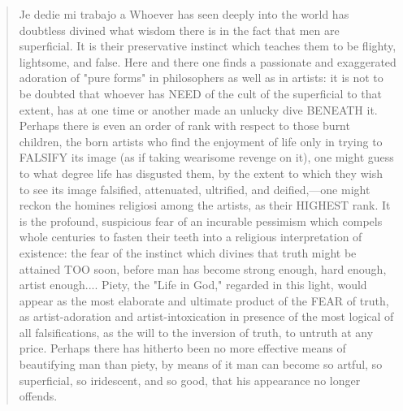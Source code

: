 \newenvironment{dedication}
     {\vspace{6ex}\begin{quotation}\begin{center}\begin{em}}
     {\par\end{em}\end{center}\end{quotation}}

     \begin{dedication}
Je dedie mi trabajo a 
Whoever has seen deeply into the world has doubtless divined what wisdom there is in the fact that men are superficial. It is their preservative instinct which teaches them to be flighty, lightsome, and false. Here and there one finds a passionate and exaggerated adoration of "pure forms" in philosophers as well as in artists: it is not to be doubted that whoever has NEED of the cult of the superficial to that extent, has at one time or another made an unlucky dive BENEATH it. Perhaps there is even an order of rank with respect to those burnt children, the born artists who find the enjoyment of life only in trying to FALSIFY its image (as if taking wearisome revenge on it), one might guess to what degree life has disgusted them, by the extent to which they wish to see its image falsified, attenuated, ultrified, and deified,—one might reckon the homines religiosi among the artists, as their HIGHEST rank. It is the profound, suspicious fear of an incurable pessimism which compels whole centuries to fasten their teeth into a religious interpretation of existence: the fear of the instinct which divines that truth might be attained TOO soon, before man has become strong enough, hard enough, artist enough.... Piety, the "Life in God," regarded in this light, would appear as the most elaborate and ultimate product of the FEAR of truth, as artist-adoration and artist-intoxication in presence of the most logical of all falsifications, as the will to the inversion of truth, to untruth at any price. Perhaps there has hitherto been no more effective means of beautifying man than piety, by means of it man can become so artful, so superficial, so iridescent, and so good, that his appearance no longer offends.
\end{dedication}